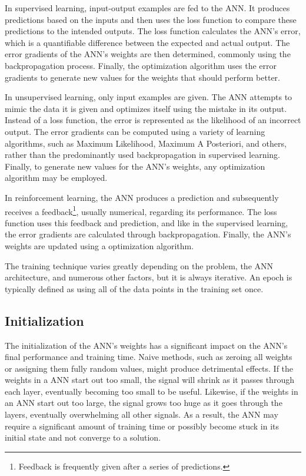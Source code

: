 In supervised learning, input-output examples are fed to the ANN. It produces predictions based on the inputs and then uses the loss function to compare these predictions to the intended outputs. The loss function calculates the ANN's error, which is a quantifiable difference between the expected and actual output. The error gradients of the ANN's weights are then determined, commonly using the backpropagation process. Finally, the optimization algorithm uses the error gradients to generate new values for the weights that should perform better.

In unsupervised learning, only input examples are given. The ANN attempts to mimic the data it is given and optimizes itself using the mistake in its output. Instead of a loss function, the error is represented as the likelihood of an incorrect output. The error gradients can be computed using a variety of learning algorithms, such as Maximum Likelihood, Maximum A Posteriori, and others, rather than the predominantly used backpropagation in supervised learning. Finally, to generate new values for the ANN's weights, any optimization algorithm may be employed.

In reinforcement learning, the ANN produces a prediction and subsequently receives a feedback\footnote{Feedback is frequently given after a series of predictions.}, usually numerical, regarding its performance. The loss function uses this feedback and prediction, and like in the supervised learning, the error gradients are calculated through backpropagation. Finally, the ANN's weights are updated using a optimization algorithm.

The training technique varies greatly depending on the problem, the ANN architecture, and numerous other factors, but it is always iterative. An epoch is typically defined as using all of the data points in the training set once.

\subsection{Initialization}
The initialization of the ANN's weights has a significant impact on the ANN's final performance and training time. Naive methods, such as zeroing all weights or assigning them fully random values, might produce detrimental effects. If the weights in a ANN start out too small, the signal will shrink as it passes through each layer, eventually becoming too small to be useful. Likewise, if the weights in an ANN start out too large, the signal grows too huge as it goes through the layers, eventually overwhelming all other signals. As a result, the ANN may require a significant amount of training time or possibly become stuck in its initial state and not converge to a solution.

